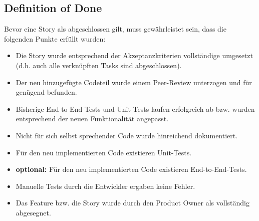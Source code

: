 \documentclass[../main.tex]{subfiles}
\begin{document}
	\subsection{Definition of Done}
	\label{section:DefinitionOfDone}
	\par Bevor eine Story als abgeschlossen gilt, muss gewährleistet sein, dass die folgenden Punkte erfüllt wurden:
	\begin{itemize}
		\item Die Story wurde entsprechend der Akzeptanzkriterien vollständige umgesetzt (d.h. auch alle verknüpften Tasks sind abgeschlossen). 
		\item Der neu hinzugefügte Codeteil wurde einem Peer-Review unterzogen und für genügend befunden.
		\item Bisherige End-to-End-Tests und Unit-Tests laufen erfolgreich ab bzw. wurden entsprechend der neuen Funktionalität angepasst.
		\item Nicht für sich selbst sprechender Code wurde hinreichend dokumentiert.
		\item Für den neu implementierten Code existieren Unit-Tests.
		\item \textbf{optional:} Für den neu implementierten Code existieren End-to-End-Tests.
		\item Manuelle Tests durch die Entwickler ergaben keine Fehler. 
		\item Das Feature bzw. die Story wurde durch den Product Owner als vollständig abgesegnet.
	\end{itemize}
\end{document}
